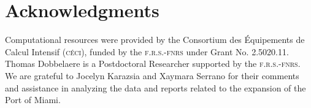 \documentclass[preprint,12pt,authoryear]{elsarticle}
\begin{document}


\section*{Acknowledgments}
Computational resources were provided by the Consortium des \'Equipements de Calcul Intensif (\textsc{c\'eci}), funded by the \textsc{f.r.s.-fnrs} under Grant No. 2.5020.11. Thomas Dobbelaere is a Postdoctoral Researcher supported by the \textsc{f.r.s.-fnrs}. We are grateful to Jocelyn Karazsia and Xaymara Serrano for their comments and assistance in analyzing the data and reports related to the expansion of the Port of Miami.



\newpage
\appendix
\end{document}
